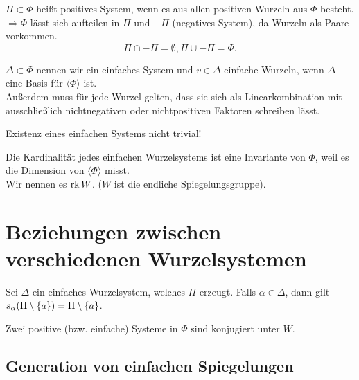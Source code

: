 \documentclass{article}
\begin{document}
\begin{defi}
    \( \Pi \subset \Phi \) heißt positives System, wenn 
    es aus allen positiven Wurzeln aus \( \Phi \) besteht.\\
    \( \Rightarrow \Phi \) lässt sich aufteilen in 
    \( \Pi \) und \( -\Pi \) (negatives System), da 
    Wurzeln als Paare vorkommen.
    \[ \Pi \cap -\Pi = \emptyset, \Pi \cup -\Pi = \Phi. \]
\end{defi}

\begin{defi}
    \( \Delta \subset \Phi \) nennen wir ein einfaches System und 
    \( v \in \Delta \) einfache Wurzeln, wenn 
    \( \Delta \) eine Basis für \( \langle \Phi \rangle \) 
    ist. \\
    Außerdem muss für jede Wurzel gelten, dass sie 
    sich als Linearkombination mit ausschließlich 
    nichtnegativen oder nichtpositiven Faktoren 
    schreiben lässt.
\end{defi}
Existenz eines einfachen Systems nicht trivial! 
\begin{bem}
    Die Kardinalität jedes einfachen Wurzelsystems 
    ist eine Invariante von \( \Phi \), weil es die 
    Dimension von \( \langle \Phi \rangle \) misst.\\
    Wir nennen es \( \operatorname{rk} W \). (\( W \) ist die endliche 
    Spiegelungsgruppe).
\end{bem}

\section{Beziehungen zwischen verschiedenen 
Wurzelsystemen}

\begin{satz}
    Sei \( \Delta \) ein einfaches Wurzelsystem, welches 
    \( \Pi \) erzeugt. Falls \( \alpha \in \Delta \), 
    dann gilt \( s_\alpha(\Pi \setminus \{a\}) 
    = \Pi \setminus \{a\} \).
\end{satz}

\begin{satz}
    Zwei positive (bzw. einfache) Systeme in \( \Phi \) 
    sind konjugiert unter \(W\).
\end{satz}

\subsection{Generation von einfachen Spiegelungen}%
\end{document}
